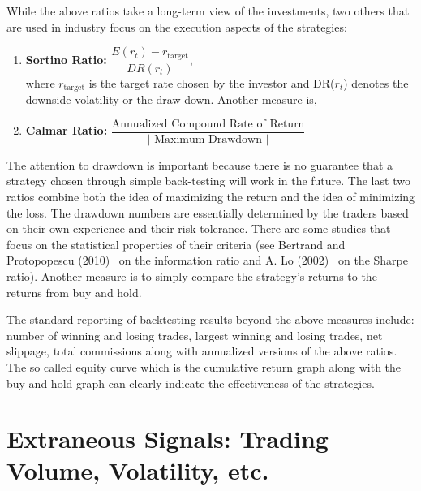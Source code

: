 While the above ratios take a long-term view of the investments, two others that are used in industry focus on the execution aspects of the strategies: 


\begin{enumerate}[--]
\item \textbf{Sortino Ratio: } $\dfrac{E(r_{t}) - r_{\text{target}}}{DR(r_{t})}$, \\

\noindent where $r_{\text{target}}$ is the target rate chosen by the investor and DR($r_t$) denotes the downside volatility or the draw down. Another measure is, \\

\item \textbf{Calmar Ratio: } $\dfrac{\text{Annualized Compound Rate of Return}}{\left| \text{ Maximum Drawdown }\right|}$ \\
\end{enumerate}


The attention to drawdown is important because there is no guarantee that a strategy chosen through simple back-testing will work in the future. The last two ratios combine both the idea of maximizing the return and the idea of minimizing the loss. The drawdown numbers are essentially determined by the traders based on their own experience and their risk tolerance. There are some studies that focus on the statistical properties of their criteria (see Bertrand and Protopopescu (2010)~\cite{bertrand} on the information ratio and A. Lo (2002)~\cite{awlo} on the Sharpe ratio). Another measure is to simply compare the strategy's returns to the returns from buy and hold.


The standard reporting of backtesting results beyond the above measures include: number of winning and losing trades, largest winning and losing trades, net slippage, total commissions along with annualized versions of the above ratios. The so called equity curve which is the cumulative return graph along with the buy and hold graph can clearly indicate the effectiveness of the strategies. 



\section{Extraneous Signals: Trading Volume, Volatility, etc.}


